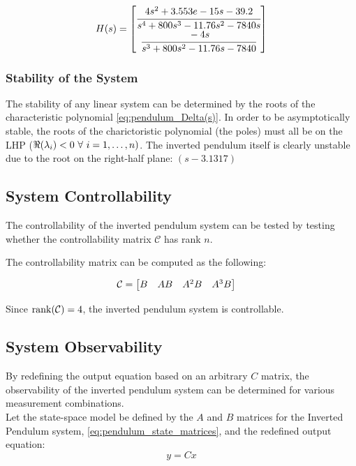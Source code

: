 \documentclass[]{article}
\newcommand{\ctrbl}{\mathcal{C}}
\begin{document}
			\begin{equation}
				H(s) = \mqty[	\cfrac{4 s^2 + 3.553e-15 s - 39.2}{s^4 + 800 s^3 - 11.76 s^2 - 7840 s}\\
								\cfrac{-4 s}{s^3 + 800 s^2 - 11.76 s - 7840}
								]
				\label{eq:pendulum_H(s)}
			\end{equation}
			
		\subsubsection{Stability of the System}
			The stability of any linear system can be determined by the roots of the characteristic polynomial \eqref{eq:pendulum_Delta(s)}. In order to be asymptotically stable, the roots of the charictoristic polynomial (the poles) must all be on the LHP ($\real(\lambda_i) < 0 \  \forall \ i = 1, \dots, n)$. The inverted pendulum itself is clearly unstable due to the root on the right-half plane: $(s-3.1317)$
	
	\newpage
	\subsection{System Controllability}
		The controllability of the inverted pendulum system can be tested by testing whether the controllability matrix $\ctrbl$ has rank $n$.
		
		The controllability matrix can be computed as the following:
		
		\begin{align}
			\ctrbl &= \mqty[B & AB & A^2B & A^3 B]
		\end{align}
		
		Since $\rank(\ctrbl) = 4$, the inverted pendulum system is controllable.

	\subsection{System Observability}
		By redefining the output equation based on an arbitrary $C$ matrix, the observability of the inverted pendulum system can be determined for various measurement combinations.\\
		
		Let the state-space model be defined by the $A$ and $B$ matrices for the Inverted Pendulum system, \eqref{eq:pendulum_state_matrices}, and the redefined output equation:
		\begin{equation}
			y = C x \label{eq:generalOutputdef}
		\end{equation}
		
\end{document}
